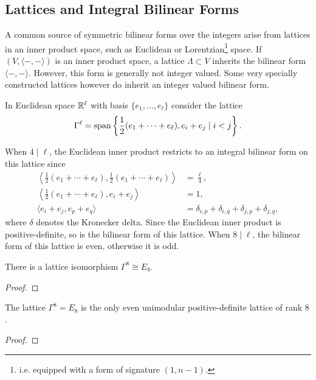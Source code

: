 
\subsection{Lattices and Integral Bilinear Forms}

A common source of symmetric bilinear forms over the integers arise from lattices in an inner product space, such as Euclidean or Lorentzian\footnote{i.e. equipped with a form of signature $(1,n-1)$.} space.
If $(V,\langle -,-\rangle)$ is an inner product space, a lattice $\Lambda\subset V$ inherits the bilinear form $\langle -,-\rangle$. However, this form is generally not integer valued. Some very specially constructed lattices however do inherit an integer valued bilinear form.

\begin{definition} 
	In Euclidean space $\mathbb{R}^\ell$ with basis $\{e_1,\ldots, e_\ell\}$ consider the lattice
\[
	\Gamma^\ell = \operatorname{span}\left\{\frac{1}{2}(e_1+\cdots + e_\ell), e_i+e_j \mid i<j\right\}.
\]
\end{definition}

When $4\mid \ell$, the Euclidean inner product restricts to an integral bilinear form on this lattice since
\[
	\begin{aligned}
		\left\langle \frac{1}{2}(e_1+\cdots+e_\ell), \frac{1}{2}(e_1+\cdots+e_\ell)\right\rangle & = \frac{\ell}{4},                                      \\
		\left\langle \frac{1}{2}(e_1+\cdots+e_\ell), e_i+e_j\right\rangle                        & = 1,                                                   \\
		\langle e_i+e_j, e_p +e_q\rangle                                                         & = \delta_{i,p}+\delta_{i,q}+\delta_{j,p}+\delta_{j,q},
	\end{aligned}
\]
where $\delta$ denotes the Kronecker delta. Since the Euclidean inner product is positive-definite, so is the bilinear form of this lattice. When $8\mid\ell$, the bilinear form of this lattice is even, otherwise it is odd. 

\begin{proposition}
	There is a lattice isomorphism $\Gamma^8\cong E_8$.
\end{proposition}
\begin{proof}
\end{proof}

\begin{theorem}[Mordell]
	The lattice $\Gamma^8=E_8$ is the only even unimodular positive-definite lattice of rank $8$.
\end{theorem}
\begin{proof}
\end{proof}

